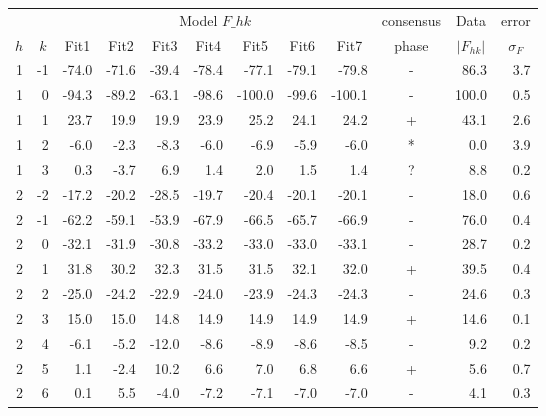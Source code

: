 \begin{table}[htbp]
  \centering
\begin{tabular}{rrrrrrrrrcrr}
\hline
& & \multicolumn{7}{c}{Model $F\_{hk}$} & consensus & \multicolumn{1}{c}{Data} & \multicolumn{1}{c}{error} \\
\cline{3-9}
\multicolumn{1}{c}{$h$} & \multicolumn{1}{c}{$k$} & \multicolumn{1}{c}{Fit1} & \multicolumn{1}{c}{Fit2} & \multicolumn{1}{c}{Fit3} & \multicolumn{1}{c}{Fit4} & \multicolumn{1}{c}{Fit5} & \multicolumn{1}{c}{Fit6} & \multicolumn{1}{c}{Fit7} & phase & \multicolumn{1}{c}{$\left|F_{hk}\right|$} & \multicolumn{1}{c}{$\sigma_F$} \\ 
\hline
1 & -1 & -74.0 & -71.6 & -39.4 & -78.4 &  -77.1 & -79.1 &  -79.8 & - &  86.3 & 3.7 \\ 
1 &  0 & -94.3 & -89.2 & -63.1 & -98.6 & -100.0 & -99.6 & -100.1 & - & 100.0 & 0.5 \\ 
1 &  1 &  23.7 &  19.9 &  19.9 &  23.9 &   25.2 &  24.1 &   24.2 & + &  43.1 & 2.6 \\ 
1 &  2 &  -6.0 &  -2.3 &  -8.3 &  -6.0 &   -6.9 &  -5.9 &   -6.0 & * &   0.0 & 3.9 \\ 
1 &  3 &   0.3 &  -3.7 &   6.9 &   1.4 &    2.0 &   1.5 &    1.4 & ? &   8.8 & 0.2 \\ 
2 & -2 & -17.2 & -20.2 & -28.5 & -19.7 &  -20.4 & -20.1 &  -20.1 & - &  18.0 & 0.6 \\ 
2 & -1 & -62.2 & -59.1 & -53.9 & -67.9 &  -66.5 & -65.7 &  -66.9 & - &  76.0 & 0.4 \\ 
2 &  0 & -32.1 & -31.9 & -30.8 & -33.2 &  -33.0 & -33.0 &  -33.1 & - &  28.7 & 0.2 \\ 
2 &  1 &  31.8 &  30.2 &  32.3 &  31.5 &   31.5 &  32.1 &   32.0 & + &  39.5 & 0.4 \\ 
2 &  2 & -25.0 & -24.2 & -22.9 & -24.0 &  -23.9 & -24.3 &  -24.3 & - &  24.6 & 0.3 \\ 
2 &  3 &  15.0 &  15.0 &  14.8 &  14.9 &   14.9 &  14.9 &   14.9 & + & 14.6 & 0.1 \\ 
2 &  4 &  -6.1 &  -5.2 & -12.0 &  -8.6 &   -8.9 &  -8.6 &   -8.5 & - & 9.2 & 0.2 \\ 
2 &  5 &   1.1 &  -2.4 &  10.2 &   6.6 &    7.0 &   6.8 &    6.6 & + & 5.6 & 0.7 \\ 
2 &  6 &   0.1 &   5.5 &  -4.0 &  -7.2 &   -7.1 &  -7.0 &   -7.0 & - & 4.1 & 0.3 \\ 

\end{tabular}
\end{table}
